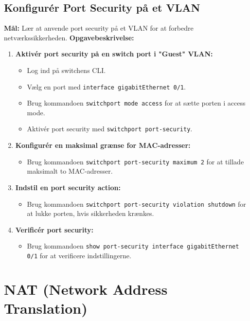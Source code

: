 \subsection*{Konfigurér Port Security på et VLAN}
\textbf{Mål:} Lær at anvende port security på et VLAN for at forbedre netværkssikkerheden.
\newline\newline\noindent
\textbf{Opgavebeskrivelse:}
\begin{enumerate}
	\item \textbf{Aktivér port security på en switch port i "Guest" VLAN:}
	\begin{itemize}
		\item Log ind på switchens CLI.
		\item Vælg en port med \texttt{interface gigabitEthernet 0/1}.
		\item Brug kommandoen \texttt{switchport mode access} for at sætte porten i access mode.
		\item Aktivér port security med \texttt{switchport port-security}.
	\end{itemize}
	\item \textbf{Konfigurér en maksimal grænse for MAC-adresser:}
	\begin{itemize}
		\item Brug kommandoen \texttt{switchport port-security maximum 2} for at tillade maksimalt to MAC-adresser.
	\end{itemize}
	\item \textbf{Indstil en port security action:}
	\begin{itemize}
		\item Brug kommandoen \texttt{switchport port-security violation shutdown} for at lukke porten, hvis sikkerheden krænkes.
	\end{itemize}
	\item \textbf{Verificér port security:}
	\begin{itemize}
		\item Brug kommandoen \texttt{show port-security interface gigabitEthernet 0/1} for at verificere indstillingerne.
	\end{itemize}
\end{enumerate}

\section{NAT (Network Address Translation)}	
